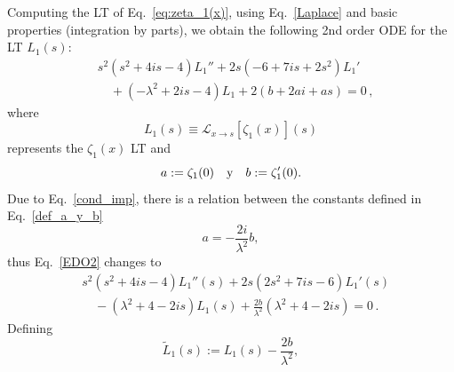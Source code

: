 \documentclass[%
 aip,
 jmp,%
 amsmath,amssymb,
 reprint,%
]{revtex4-2}
\begin{document}
Computing the LT of Eq.~\eqref{eq:zeta_1(x)}, using Eq.~\eqref{Laplace} and basic properties (integration by parts), we obtain the following 2nd order ODE for the LT $L_1(s)$:
\begin{equation}\label{EDO2}
\begin{aligned}
& s^2 \left(s^2+4is -4\right)L_1'' + 2s \left(-6+7is+2s^2\right)L_1' \\
& \quad + \left(-\lambda^2+2is-4\right)L_1+2\left(b+2ai+as\right)=0\,,
\end{aligned}
\end{equation}
where 
\[
L_1(s)\equiv\mathcal{L}_{x\to s}\left[\zeta_1(x)\right](s)
\]
represents the $\zeta_1(x)$ LT and
\begin{equation}\label{def_a_y_b}
    a:=\zeta_1(0)\quad \textnormal{y}\quad b:=\zeta_1'(0).
\end{equation}
Due to Eq.~\eqref{cond_imp}, there is a relation between the constants defined in Eq.~\eqref{def_a_y_b}
\begin{equation*}
    a= -\frac{2i}{\lambda^2} b,
\end{equation*}
thus Eq.~\eqref{EDO2} changes to
\begin{equation}\label{EDO3}
\begin{aligned}
& s^2 \left(s^2+4is -4\right)L_1''(s) + 2s \left(2s^2+7is-6\right)L_1'(s) \\
& \quad - \left(\lambda^2+4 -2is\right)L_1(s)+ \frac{2b}{\lambda^2} \left( \lambda^2 +4  -2i s\right)=0\,.
\end{aligned}
\end{equation}
Defining
\[
\widetilde L_1(s):=   L_1(s) -  \frac{2b}{\lambda^2},
\]
\end{document}
